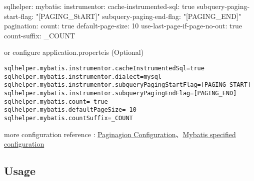 \documentclass[
]{book}
\newenvironment{Shaded}{\begin{snugshade}}{\end{snugshade}}
\newcommand{\AttributeTok}[1]{\textcolor[rgb]{0.77,0.63,0.00}{#1}}
\newcommand{\CharTok}[1]{\textcolor[rgb]{0.31,0.60,0.02}{#1}}
\newcommand{\DecValTok}[1]{\textcolor[rgb]{0.00,0.00,0.81}{#1}}
\newcommand{\FunctionTok}[1]{\textcolor[rgb]{0.00,0.00,0.00}{#1}}
\newcommand{\StringTok}[1]{\textcolor[rgb]{0.31,0.60,0.02}{#1}}
\begin{document}
\begin{Shaded}
\begin{Highlighting}[]
\FunctionTok{sqlhelper:}
  \FunctionTok{mybatis:}
    \FunctionTok{instrumentor:}
      \FunctionTok{cache-instrumented-sql:}\AttributeTok{ }\CharTok{true}
      \FunctionTok{subquery-paging-start-flag:}\AttributeTok{ }\StringTok{"[PAGING_StART]"}
      \FunctionTok{subquery-paging-end-flag:}\AttributeTok{ }\StringTok{"[PAGING_END]"}
    \FunctionTok{pagination:}
      \FunctionTok{count:}\AttributeTok{ }\CharTok{true}
      \FunctionTok{default-page-size:}\AttributeTok{ }\DecValTok{10}
      \FunctionTok{use-last-page-if-page-no-out:}\AttributeTok{ }\CharTok{true}
      \FunctionTok{count-suffix:}\AttributeTok{ _COUNT}
\end{Highlighting}
\end{Shaded}

or configure application.properteis (Optional)

\begin{verbatim}
sqlhelper.mybatis.instrumentor.cacheInstrumentedSql=true
sqlhelper.mybatis.instrumentor.dialect=mysql
sqlhelper.mybatis.instrumentor.subqueryPagingStartFlag=[PAGING_START]
sqlhelper.mybatis.instrumentor.subqueryPagingEndFlag=[PAGING_END]
sqlhelper.mybatis.count= true
sqlhelper.mybatis.defaultPageSize= 10
sqlhelper.mybatis.countSuffix=_COUNT
\end{verbatim}

more configuration reference : \protect\hyperlink{pagination_configuration}{Paginagion Configuration}、\protect\hyperlink{sqlhelper_mybatis_configuration}{Mybatis specified configuration}

\hypertarget{pagination_mybatis_springboot_usage}{%
\subsection{Usage}\label{pagination_mybatis_springboot_usage}}
\end{document}
